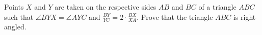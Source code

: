 \problem
Points $X$ and $Y$ are taken on the respective sides $AB$ and $BC$ of a
triangle $ABC$ such that $\angle BYX = \angle AYC$ and
$\frac{BY}{YC} = 2 \cdot \frac{BX}{XA}$.
Prove that the triangle $ABC$ is right-angled.
\solution
\endproblem
